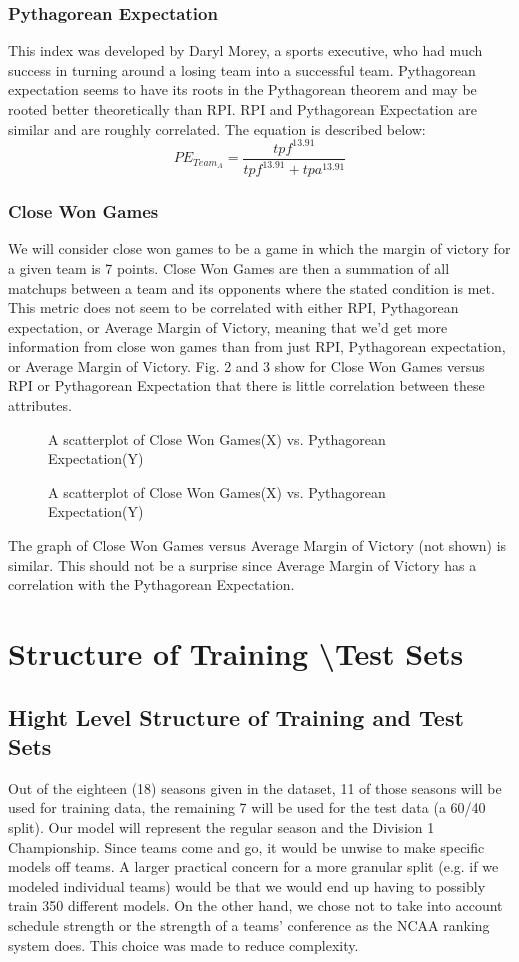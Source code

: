 \documentclass{acm_proc_article-sp}
\begin{document}
\subsubsection{Pythagorean Expectation}
This index was developed by Daryl Morey, a sports executive, who had much success in turning around 
a losing team into a successful team.\cite{feschuk} Pythagorean expectation seems to have its roots 
in the Pythagorean theorem and may be rooted better theoretically than RPI. RPI and Pythagorean 
Expectation are similar and are roughly correlated. The equation is described below:
\begin{equation}
PE_{Team_{A}} = \frac{tpf^{13.91}}{tpf^{13.91} + tpa^{13.91}}
\end{equation}
\newpage
\subsubsection{Close Won Games}
We will consider close won games to be a game in which the margin of victory for a given team is 7 points. Close Won Games are then a summation of all matchups between a team and its opponents where the stated condition is met. This metric does not seem to be correlated with either RPI, Pythagorean expectation, or Average Margin of Victory, meaning that we'd get more information from close won games than from just RPI, Pythagorean expectation, or Average Margin of Victory. Fig. 2 and 3 show for Close Won Games versus RPI or Pythagorean Expectation that there is little correlation between these attributes.
\begin{figure}
\centering
{}
\caption{A scatterplot of Close Won Games(X) vs. Pythagorean Expectation(Y)}
\end{figure}
\begin{figure}
\centering
{}
\caption{A scatterplot of Close Won Games(X) vs. Pythagorean Expectation(Y)}
\end{figure}
The graph of Close Won Games versus Average Margin of Victory (not shown) is similar. This should not be a surprise since Average Margin of Victory has a correlation with the Pythagorean Expectation.
\section{Structure of Training \textbackslash Test Sets}
\subsection{Hight Level Structure of Training and Test Sets}
Out of the eighteen (18) seasons given in the dataset, 11 of those seasons will be used for training 
data, the remaining 7 will be used for the test data (a 60/40 split). Our model will represent the 
regular season and the Division 1 Championship. Since teams come and go, it would be unwise to make 
specific models off teams. A larger practical concern for a more granular split (e.g. if we modeled individual teams) would be that we would end up having to possibly train 350 different models. On the other hand, we chose not to take into account schedule strength or the strength of a teams' conference as the NCAA ranking system does. This choice was made to reduce complexity.
\end{document}
